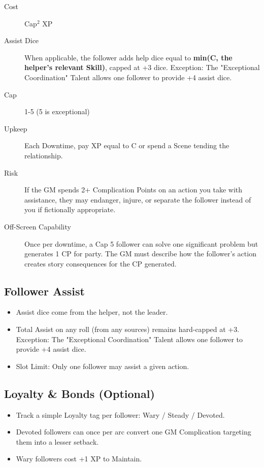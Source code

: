 \begin{description}
\item[Cost] Cap$^2$ XP
\item[Assist Dice] When applicable, the follower adds help dice equal to \textbf{min(C, the helper's relevant Skill)}, capped at +3 dice. Exception: The "Exceptional Coordination" Talent allows one follower to provide +4 assist dice.
\item[Cap] 1-5 (5 is exceptional)
\item[Upkeep] Each Downtime, pay XP equal to C or spend a Scene tending the relationship.
\item[Risk] If the GM spends 2+ Complication Points on an action you take with assistance, they may endanger, injure, or separate the follower instead of you if fictionally appropriate.
\item[Off-Screen Capability] Once per downtime, a Cap 5 follower can solve one significant problem but generates 1 CP for party. The GM must describe how the follower's action creates story consequences for the CP generated.
\end{description}

\subsection{Follower Assist}
\begin{itemize}
    \item Assist dice come from the helper, not the leader.
    \item Total Assist on any roll (from any sources) remains hard-capped at +3. Exception: The "Exceptional Coordination" Talent allows one follower to provide +4 assist dice.
    \item Slot Limit: Only one follower may assist a given action.
\end{itemize}

\subsection{Loyalty \& Bonds (Optional)}
\begin{itemize}
    \item Track a simple Loyalty tag per follower: Wary / Steady / Devoted.
    \item Devoted followers can once per arc convert one GM Complication targeting them into a lesser setback.
    \item Wary followers cost +1 XP to Maintain.
\end{itemize}

